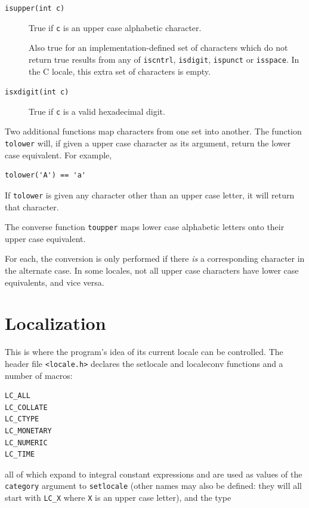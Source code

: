 \begin{description}
   \item[\texttt{isupper(int c)}] 
    True if \texttt{c} is an upper case alphabetic character.


    Also true for an implementation-defined set of characters
     which do not return true results from any of \texttt{iscntrl},
     \texttt{isdigit}, \texttt{ispunct} or \texttt{isspace}.
     In the C locale, this extra set of characters is empty.

   

   \item[\texttt{isxdigit(int c)}] True if \texttt{c} is a valid hexadecimal digit.
  \end{description}

  Two additional functions map characters from one set into
   another. The function \texttt{tolower} will, if given a upper case
   character as its argument, return the lower case equivalent.
   For example,


  \begin{Verbatim}
tolower('A') == 'a'
\end{Verbatim}

  If \texttt{tolower} is given any character other than an  upper  case
   letter, it will return that character.


  The converse function \texttt{toupper}  maps  lower  case  alphabetic
   letters onto their upper case equivalent.


  For each, the conversion is only performed  if  there  \textit{is}  a
   corresponding  character  in  the  alternate  case.  In some
   locales, not all  upper  case  characters  have  lower  case
   equivalents, and vice versa.


 
        \section{Localization}\label{sec:loc}
        

  

  This is where the program's idea of its current locale can
   be controlled.  The header file \texttt{<locale.h>} declares the
   setlocale and localeconv functions and a number of macros:


  \begin{Verbatim}
LC_ALL
LC_COLLATE
LC_CTYPE
LC_MONETARY
LC_NUMERIC
LC_TIME
\end{Verbatim}

  all of which expand to integral constant expressions and are used as
   values of the \texttt{category} argument to \texttt{setlocale}
   (other names may also be defined: they will all start with \texttt{LC\_X}
   where \texttt{X} is an upper case letter), and the type


